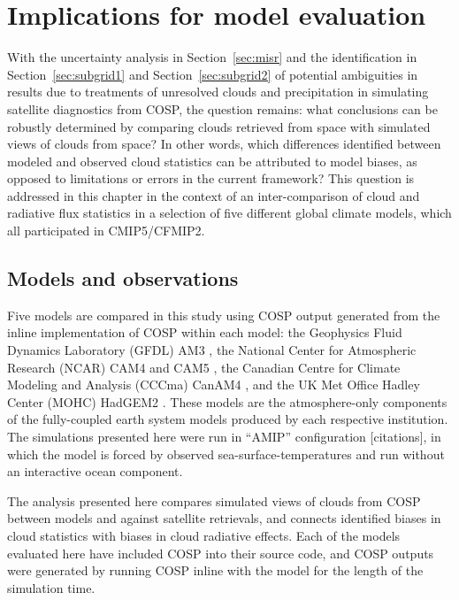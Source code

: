 \chapter{Implications for model evaluation}\label{sec:cmip5}

With the uncertainty analysis in Section~\ref{sec:misr} and the
identification in Section~\ref{sec:subgrid1} and
Section~\ref{sec:subgrid2} of potential ambiguities in results due to
treatments of unresolved clouds and precipitation in simulating
satellite diagnostics from COSP, the question remains: what conclusions
can be robustly determined by comparing clouds retrieved from space with
simulated views of clouds from space? In other words, which differences
identified between modeled and observed cloud statistics can be
attributed to model biases, as opposed to limitations or errors in the
current framework? This question is addressed in this chapter in the
context of an inter-comparison of cloud and radiative flux statistics in
a selection of five different global climate models, which all
participated in CMIP5/CFMIP2.

\section{Models and observations}\label{models-and-observations}

Five models are compared in this study using COSP output generated from
the inline implementation of COSP within each model: the Geophysics
Fluid Dynamics Laboratory (GFDL) AM3 \citep{donner_et_al_2011}, the
National Center for Atmospheric Research (NCAR) CAM4
\citep{neale_et_al_2010a} and CAM5 \citep{neale_et_al_2010b}, the
Canadian Centre for Climate Modeling and Analysis (CCCma) CanAM4
\citep{von_salzen_et_al_2012}, and the UK Met Office Hadley Center
(MOHC) HadGEM2 \citep{martin_et_al_2011}. These models are the
atmosphere-only components of the fully-coupled earth system models
produced by each respective institution. The simulations presented here
were run in ``AMIP'' configuration {[}citations{]}, in which the model
is forced by observed sea-surface-temperatures and run without an
interactive ocean component.

The analysis presented here compares simulated views of clouds from COSP
between models and against satellite retrievals, and connects identified
biases in cloud statistics with biases in cloud radiative effects. Each
of the models evaluated here have included COSP into their source code,
and COSP outputs were generated by running COSP inline with the model
for the length of the simulation time.

